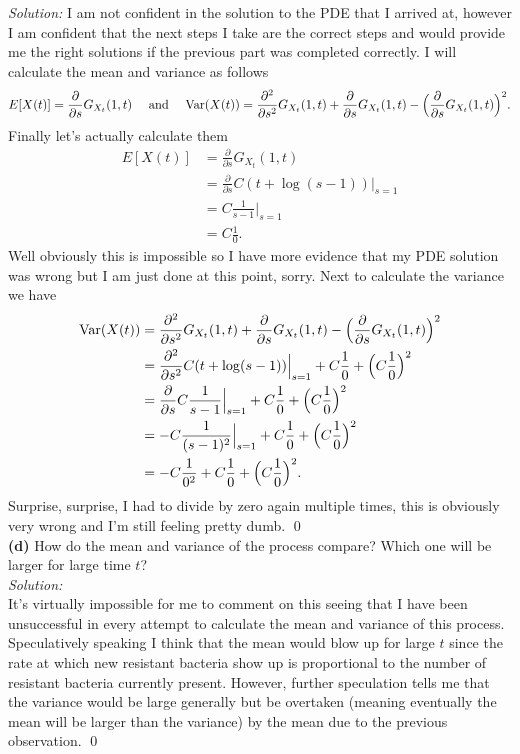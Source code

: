 \documentclass[10pt]{amsart}
\begin{document}
\noindent
\textit{Solution:}
I am not confident in the solution to the PDE that I arrived at, however I am confident that the next steps I take are the correct steps and would provide me the right solutions if the previous part was completed correctly.
I will calculate the mean and variance as follows
$$
E[X(t)] = \frac {\partial}{\partial s}G_{X_t}(1, t) \quad \text{ and } \quad {\rm Var}(X(t)) = \frac {\partial^2}{\partial s^2}G_{X_t}(1, t) + \frac {\partial}{\partial s}G_{X_t}(1, t) - \Big(\frac {\partial}{\partial s}G_{X_t}(1, t)\Big)^2.
$$
Finally let's actually calculate them
\begin{align*}
E[X(t)] &= \frac {\partial}{\partial s}G_{X_t}(1, t) \\
	&= \frac {\partial}{\partial s} C(t + \log(s - 1)) \Big|_{s=1} \\
	&= C\frac 1 {s -1} \Big|_{s=1} \\
	&= C\frac 1 {0}.
\end{align*}
Well obviously this is impossible so I have more evidence that my PDE solution was wrong but I am just done at this point, sorry.
Next to calculate the variance we have
\begin{align*}
{\rm Var}(X(t)) &= \frac {\partial^2}{\partial s^2}G_{X_t}(1, t) + \frac {\partial}{\partial s}G_{X_t}(1, t) - \Big(\frac {\partial}{\partial s}G_{X_t}(1, t)\Big)^2 \\
	&= \frac {\partial^2}{\partial s^2}C(t + \log(s - 1)) \Big|_{s=1} + C\frac 1 {0} + \Big(C\frac 1 {0}\Big)^2 \\
	&= \frac {\partial}{\partial s}C\frac 1 {s - 1} \Big|_{s=1} + C\frac 1 {0} + \Big(C\frac 1 {0}\Big)^2 \\
	&= - C \frac 1 {(s - 1)^2} \Big|_{s=1} + C\frac 1 {0} + \Big(C\frac 1 {0}\Big)^2 \\
	&= - C \frac 1 {0^2} + C\frac 1 {0} + \Big(C\frac 1 {0}\Big)^2.
\end{align*}
Surprise, surprise, I had to divide by zero again multiple times, this is obviously very wrong and I'm still feeling pretty dumb.
\qed \\

\noindent
{\bf (d)} How do the mean and variance of the process compare? Which one will be larger for large time $t$? \\

\noindent
\textit{Solution:} \\
It's virtually impossible for me to comment on this seeing that I have been unsuccessful in every attempt to calculate the mean and variance of this process.
Speculatively speaking I think that the mean would blow up for large $t$ since the rate at which new resistant bacteria show up is proportional to the number of resistant bacteria currently present.
However, further speculation tells me that the variance would be large generally but be overtaken (meaning eventually the mean will be larger than the variance) by the mean due to the previous observation.
\qed \\
\end{document}
